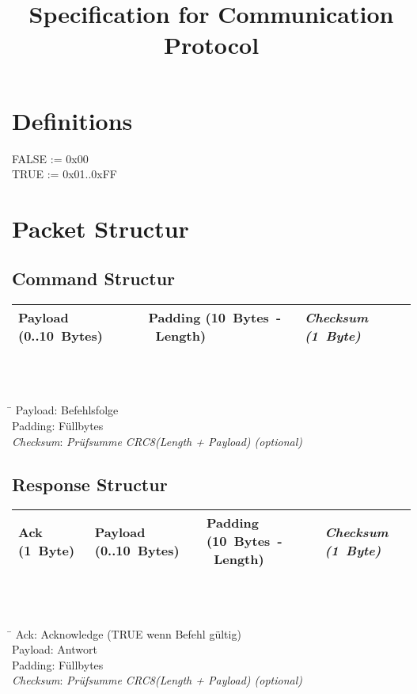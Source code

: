 \documentclass[10pt,a4paper]{article}
\title{Specification for Communication Protocol}
\author{}
\date{}
\begin{document}
\maketitle
\tableofcontents
\section*{Definitions}
FALSE := 0x00\\
TRUE := 0x01..0xFF\\

\section{Packet Structur}
\subsection{Command Structur}
\begin{tabular}{|p{2.2cm}|p{3.2cm}|p{2cm}|}
	\hline 
	Payload \mbox{(0..10 Bytes)} & 
	Padding \mbox{(10 Bytes - Length)} & 
	\textit{Checksum \mbox{(1 Byte)}} \\
	\hline 
\end{tabular}  
\\\\
\begin{tabbing}
	\hspace*{2cm} \= \kill
	Payload: \>Befehlsfolge\\
	Padding: \>Füllbytes\\
	\textit{Checksum}: \>\textit{Prüfsumme CRC8(Length + Payload) (optional)}\\
\end{tabbing}

\subsection{Response Structur} 
\begin{tabular}{|p{1.5cm}|p{2.2cm}|p{3.2cm}|p{2cm}|}
	\hline 
	Ack \mbox{(1 Byte)} &
	Payload \mbox{(0..10 Bytes)} & 
	Padding \mbox{(10 Bytes - Length)} & 
	\textit{Checksum \mbox{(1 Byte)}} \\
	\hline 
\end{tabular}  
\\\\
\begin{tabbing}
	\hspace*{2cm} \= \kill
	Ack:	 \>Acknowledge (TRUE wenn Befehl gültig)\\
	Payload: \>Antwort\\
	Padding: \>Füllbytes\\
	\textit{Checksum}: \>\textit{Prüfsumme CRC8(Length + Payload) (optional)}\\
\end{tabbing}
\end{document}
